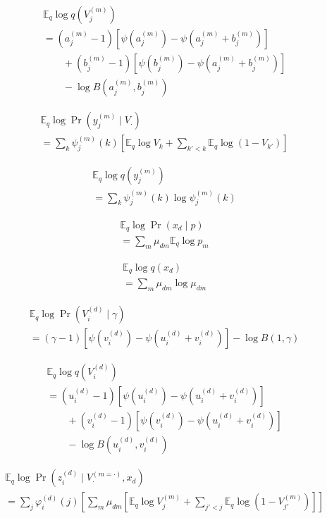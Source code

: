 \documentclass{article}
\newcommand{\digamma}[1]{\ensuremath{\psi\left(#1\right)}}
\newcommand{\Eq}{\ensuremath{\mathbb{E}_q\xspace}}
\begin{document}
\begin{align*}
    &\Eq \log q(V_j^{(m)}) \\
    &= (a_j^{(m)} - 1) \left[ \digamma{a_j^{(m)}} - \digamma{a_j^{(m)} + b_j^{(m)}} \right] \\
    &\qquad + (b_j^{(m)} - 1) \left[ \digamma{b_j^{(m)}} - \digamma{a_j^{(m)} + b_j^{(m)}} \right] \\
    &\qquad - \log B(a_j^{(m)}, b_j^{(m)})
\end{align*}

\begin{align*}
    &\Eq \log \Pr(y_j^{(m)} \mid V_\cdot) \\
    &= \sum_k \psi_j^{(m)}(k) \left[ \Eq \log V_k + \sum_{k'<k} \Eq \log (1-V_{k'}) \right]
\end{align*}

\begin{align*}
    &\Eq \log q(y_j^{(m)}) \\
    &= \sum_k \psi_j^{(m)}(k) \log \psi_j^{(m)}(k)
\end{align*}

\begin{align*}
    &\Eq \log \Pr(x_d \mid p) \\
    &= \sum_m \mu_{dm} \Eq \log p_m
\end{align*}

\begin{align*}
    &\Eq \log q(x_d) \\
    &= \sum_m \mu_{dm} \log \mu_{dm}
\end{align*}

\begin{align*}
    &\Eq \log \Pr(V_i^{(d)} \mid \gamma) \\
    &= (\gamma - 1) \left[ \digamma{v_i^{(d)}} - \digamma{u_i^{(d)} + v_i^{(d)}} \right] - \log B(1, \gamma)
\end{align*}

\begin{align*}
    &\Eq \log q(V_i^{(d)}) \\
    &= (u_i^{(d)} - 1) \left[ \digamma{u_i^{(d)}} - \digamma{u_i^{(d)} + v_i^{(d)}} \right] \\
    &\qquad + (v_i^{(d)} - 1) \left[ \digamma{v_i^{(d)}} - \digamma{u_i^{(d)} + v_i^{(d)}} \right] \\
    &\qquad - \log B(u_i^{(d)}, v_i^{(d)})
\end{align*}

\begin{align*}
    &\Eq \log \Pr(z_i^{(d)} \mid V^{(m=\cdot)}_\cdot, x_d) \\
    &= \sum_j \varphi_i^{(d)}(j) \left[ \sum_m \mu_{dm} \left[ \Eq \log V^{(m)}_j + \sum_{j'<j} \Eq \log (1-V^{(m)}_{j'}) \right] \right]
\end{align*}
\end{document}
